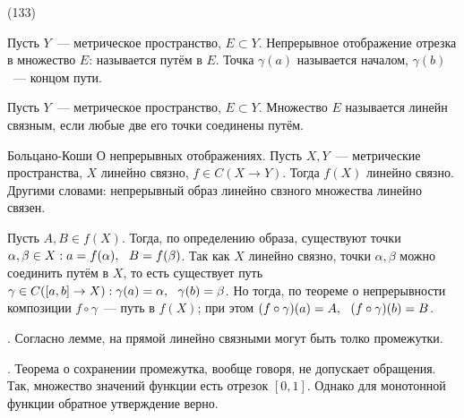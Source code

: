 (133)

\Op Пусть $Y$~--- метрическое пространство, $E \subset Y$. Непрерывное отображение отрезка в множество $E$:  называется путём в $E$. Точка $\gamma(a)$ называется началом, $\gamma(b)$~--- концом пути.

\Op Пусть $Y$~--- метрическое пространство, $E \subset Y$. Множество $E$ называется линейн связным, если любые две его точки соединены путём.

\T \q Больцано-Коши О непрерывных отображениях. Пусть $X, Y$~--- метрические пространства, $X$ линейно связно, $f \in C(X \to Y)$. Тогда $f(X)$ линейно связно. Другими словами: непрерывный образ линейно свзного множества линейно связен.

\D Пусть $A, B \in f(X)$. Тогда, по определению образа, существуют точки $\alpha, \beta \in X: a = f(\alpha),\ \  B = f(\beta)$. Так как $X$ линейно связно, точки $\alpha, \beta$ можно соединить путём в $X$, то есть существует путь $\gamma \in C([a, b] \to X): \gamma(a) = \alpha,\ \  \gamma(b) = \beta$. Но тогда, по теореме о непрерывности композиции $f \circ \gamma$~--- путь в $f(X)$; при этом $(f \circ \gamma)(a) = A,\ \  (f \circ \gamma)(b) = B$.

. Согласно лемме, на прямой линейно связными могут быть толко промежутки.

. Теорема о сохранении промежутка, вообще говоря, не допускает обращения. Так, множество значений функции \F{$f(x) = \begin{cases}x, &x \in [0, 1],\\ 0, & x \in (1, 2].\end{cases}$} есть отрезок $[0, 1]$. Однако для монотонной функции обратное утверждение верно.